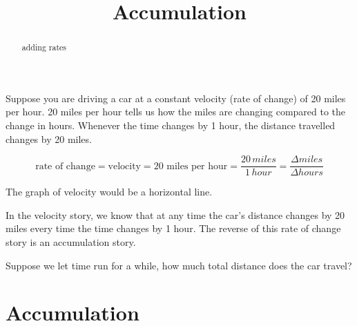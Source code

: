 \documentclass{ximera}
\title{Accumulation}
\begin{document}
\begin{abstract}
adding rates
\end{abstract}
\maketitle





Suppose you are driving a car at a constant velocity (rate of change) of 20 miles per hour. 20 miles per hour tells us how the miles are changing compared to the change in hours.  Whenever the time changes by 1 hour, the distance travelled changes by 20 miles.

\[
\text{rate of change} = \text{velocity} = \text{20 miles per hour} = \frac{20 \, miles}{1 \, hour} = \frac{\Delta miles}{\Delta hours}
\]


The graph of velocity would be a horizontal line.



\begin{image}
\end{image}

In the velocity story, we know that at any time the car's distance changes by 20 miles every time the time changes by 1 hour.  The reverse of this rate of change story is an accumulation story.

Suppose we let time run for a while, how much total distance does the car travel?



\section{Accumulation}
\end{document}
